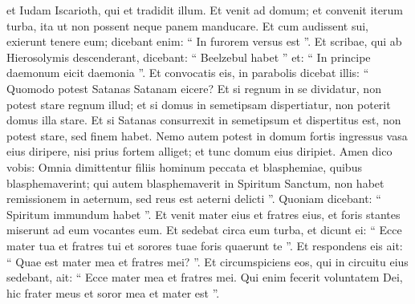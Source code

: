 \begin{biblechapter}
\begin{biblechapter}
\begin{biblechapter}
\verse et Iudam Iscarioth, qui et tradidit illum.
 \verse Et venit ad domum; et convenit iterum turba, ita ut non possent neque panem manducare. 
\verse Et cum audissent sui, exierunt tenere eum; dicebant enim: “ In furorem versus est ”.
 \verse Et scribae, qui ab Hierosolymis descenderant, dicebant: “ Beelzebul habet ” et: “ In principe daemonum eicit daemonia ”. 
\verse Et convocatis eis, in parabolis dicebat illis: “ Quomodo potest Satanas Satanam eicere? 
\verse Et si regnum in se dividatur, non potest stare regnum illud; 
\verse et si domus in semetipsam dispertiatur, non poterit domus illa stare. 
\verse Et si Satanas consurrexit in semetipsum et dispertitus est, non potest stare, sed finem habet. 
\verse Nemo autem potest in domum fortis ingressus vasa eius diripere, nisi prius fortem alliget; et tunc domum eius diripiet. 
\verse Amen dico vobis: Omnia dimittentur filiis hominum peccata et blasphemiae, quibus blasphemaverint; 
 \verse qui autem blasphemaverit in Spiritum Sanctum, non habet remissionem in aeternum, sed reus est aeterni delicti ”. 
\verse Quoniam dicebant: “ Spiritum immundum habet ”.
 \verse Et venit mater eius et fratres eius, et foris stantes miserunt ad eum vocantes eum. 
\verse Et sedebat circa eum turba, et dicunt ei: “ Ecce mater tua et fratres tui et sorores tuae foris quaerunt te ”. 
\verse Et respondens eis ait: “ Quae est mater mea et fratres mei? ”. 
\verse Et circumspiciens eos, qui in circuitu eius sedebant, ait: “ Ecce mater mea et fratres mei. 
\verse Qui enim fecerit voluntatem Dei, hic frater meus et soror mea et mater est ”.
 

\end{biblechapter}
\end{biblechapter}
\end{biblechapter}
